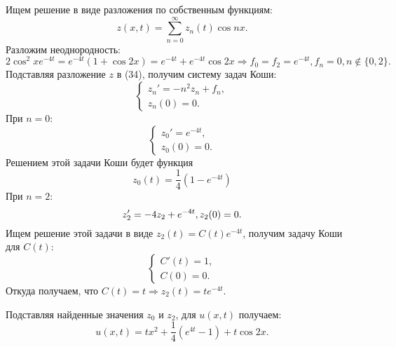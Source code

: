\documentclass[11pt]{article}
\begin{document}
Ищем решение в виде разложения по собственным функциям:
\begin{equation*}
z(x, t) = \sum_{n = 0}^{\infty}z_n(t)\cos nx.
\end{equation*}
Разложим неоднородность:
\begin{equation*}
2\cos^2xe^{-4t} = e^{-4t}(1 + \cos 2x) = e^{-4t} + e^{-4t}\cos 2x \Rightarrow f_0 = f_2 = e^{-4t},
f_n = 0, n \notin \{0, 2\}.
\end{equation*}
Подставляя разложение $z$ в (34), получим систему задач Коши:
\begin{equation}
\begin{cases}
z_n' = -n^2z_n + f_n, \\
z_n(0) = 0.
\end{cases}
\end{equation}
При $n = 0$:
\begin{equation*}
\begin{cases}
z_0' = e^{-4t}, \\
z_0(0) = 0.
\end{cases}
\end{equation*}
Решением этой задачи Коши будет функция
\begin{equation}
z_0(t) = \frac14(1 - e^{-4t})
\end{equation}
При $n = 2$:
\begin{equation*}
z_2' = -4z_2 + e^{-4t}, \\
z_2(0) = 0.
\end{equation*}
Ищем решение этой задачи в виде $z_2(t) = C(t)e^{-4t}$, получим задачу Коши для $C(t)$:
\begin{equation*}
\begin{cases}
C'(t) = 1, \\
C(0) = 0.
\end{cases}
\end{equation*}
Откуда получаем, что $C(t) = t \Rightarrow z_2(t) = te^{-4t}$.

Подставляя найденные значения $z_0$ и $z_2$, для $u(x, t)$ получаем:
\begin{equation}
u(x, t) = tx^2 + \frac14(e^{4t} - 1) + t\cos 2x.
\end{equation}
\end{document}
